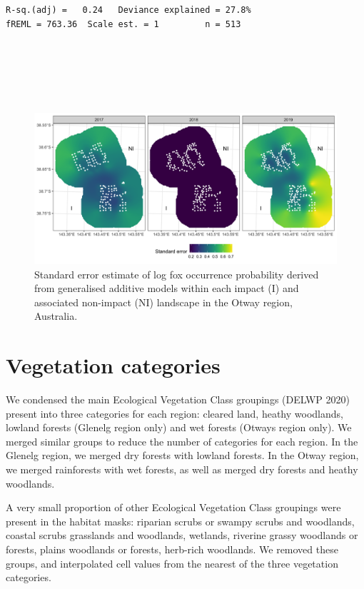 \documentclass[11pt,a4paper,titlepage,twoside,openright]{style/unimelbthesis}
\begin{document}
\begin{mainmatter}
\begin{verbatim}
R-sq.(adj) =   0.24   Deviance explained = 27.8%
fREML = 763.36  Scale est. = 1         n = 513
\end{verbatim}
\newpage

\(~\)

\(~\)

\(~\)
\begin{figure}

{\centering \includegraphics[width=1\linewidth]{figure/c3/fox_occ_se_otways_600dpi} 

}

\caption{Standard error estimate of log fox occurrence probability derived from generalised additive models within each impact (I) and associated non-impact (NI) landscape in the Otway region, Australia.}\label{fig:density-fox-se-o}
\end{figure}
\newpage

\hypertarget{density-app-veg}{%
\section{Vegetation categories}\label{density-app-veg}}

We condensed the main Ecological Vegetation Class groupings (DELWP 2020) present into three categories for each region: cleared land, heathy woodlands, lowland forests (Glenelg region only) and wet forests (Otways region only). We merged similar groups to reduce the number of categories for each region. In the Glenelg region, we merged dry forests with lowland forests. In the Otway region, we merged rainforests with wet forests, as well as merged dry forests and heathy woodlands.

A very small proportion of other Ecological Vegetation Class groupings were present in the habitat masks: riparian scrubs or swampy scrubs and woodlands, coastal scrubs grasslands and woodlands, wetlands, riverine grassy woodlands or forests, plains woodlands or forests, herb-rich woodlands. We removed these groups, and interpolated cell values from the nearest of the three vegetation categories.


\end{mainmatter}
\end{document}
